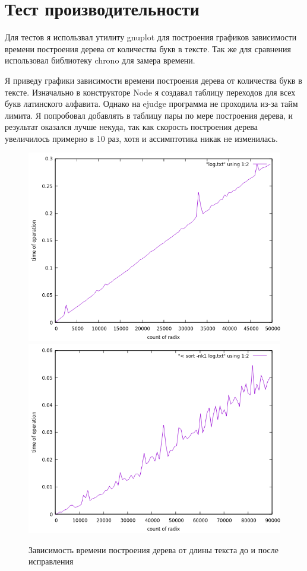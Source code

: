 \section{Тест производительности}

Для тестов я использвал утилиту gnuplot для построения графиков зависимости времени построения дерева от количества букв в тексте. Так же для сравнения использовал библиотеку chrono для замера времени.

Я приведу графики зависимости времени построения дерева от количества букв в тексте. Изначально в конструкторе Node я создавал таблицу переходов для всех букв латинского алфавита. Однако на ejudge программа не проходила из-за тайм лимита. Я попробовал добавлять в таблицу пары по мере построения дерева, и результат оказался лучше некуда, так как скорость построения дерева увеличилось примерно в 10 раз, хотя и ассимптотика никак не изменилась.
\begin{figure}[h]
  \includegraphics[scale=0.5]{../plots/onsf.png}
  \includegraphics[scale=0.5]{../plots/onsf2.png}
  \caption{Зависимость времени построения дерева от длины текста до и после исправления}
\end{figure}


